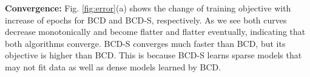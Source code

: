 \documentclass{article}
\begin{document}
{\bf Convergence:} Fig. \ref{fig:error}(a) shows the change of training objective with increase of epochs for BCD and BCD-S, respectively. As we see both curves decrease monotonically and become flatter and flatter eventually, indicating that both algorithms converge. BCD-S converges much faster than BCD, but its objective is higher than BCD. This is because BCD-S learns sparse models that may not fit data as well as dense models learned by BCD.


\end{document}
